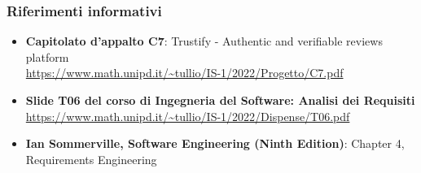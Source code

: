     \subsubsection{Riferimenti informativi}
    \begin{itemize}
        \item \textbf{Capitolato d'appalto C7}: Trustify - Authentic and verifiable reviews platform \\
        \url{https://www.math.unipd.it/~tullio/IS-1/2022/Progetto/C7.pdf}
        \item \textbf{Slide T06 del corso di Ingegneria del Software: Analisi dei Requisiti} \\ \url{https://www.math.unipd.it/~tullio/IS-1/2022/Dispense/T06.pdf}
        \item \textbf{Ian Sommerville, Software Engineering (Ninth Edition)}: Chapter 4, Requirements Engineering
    \end{itemize}